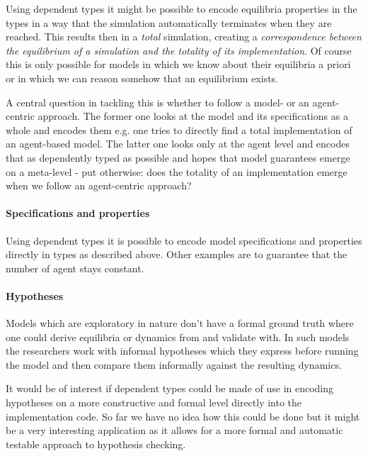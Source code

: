Using dependent types it might be possible to encode equilibria properties in the types in a way that the simulation automatically terminates when they are reached. This results then in a \textit{total} simulation, creating a \textit{correspondence between the equilibrium of a simulation and the totality of its implementation}. Of course this is only possible for models in which we know about their equilibria a priori or in which we can reason somehow that an equilibrium exists.

A central question in tackling this is whether to follow a model- or an agent-centric approach. The former one looks at the model and its specifications as a whole and encodes them e.g. one tries to directly find a total implementation of an agent-based model. The latter one looks only at the agent level and encodes that as dependently typed as possible and hopes that model guarantees emerge on a meta-level - put otherwise: does the totality of an implementation emerge when we follow an agent-centric approach?

\paragraph{Specifications and properties}
Using dependent types it is possible to encode model specifications and properties directly in types as described above. Other examples are to guarantee that the number of agent stays constant.

\paragraph{Hypotheses}
Models which are exploratory in nature don't have a formal ground truth where one could derive equilibria or dynamics from and validate with. In such models the researchers work with informal hypotheses which they express before running the model and then compare them informally against the resulting dynamics.

It would be of interest if dependent types could be made of use in encoding hypotheses on a more constructive and formal level directly into the implementation code. So far we have no idea how this could be done but it might be a very interesting application as it allows for a more formal and automatic testable approach to hypothesis checking.

